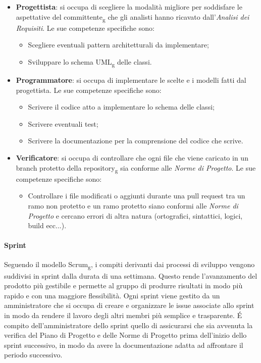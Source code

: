 \begin{itemize}
\item \textbf{Progettista}: si occupa di scegliere la modalità migliore per soddisfare le aspettative del committente\textsubscript{g} che gli analisti hanno ricavato dall'\textit{Analisi dei Requisiti}. Le sue competenze specifiche sono:
\begin{itemize}
	\item Scegliere eventuali pattern architetturali da implementare;
	\item Sviluppare lo schema UML\textsubscript{g} delle classi.
\end{itemize}

\item \textbf{Programmatore}: si occupa di implementare le scelte e i modelli fatti dal progettista. Le sue competenze specifiche sono:
\begin{itemize}
	\item Scrivere il codice atto a implementare lo schema delle classi;
	\item Scrivere eventuali test;
	\item Scrivere la documentazione per la comprensione del codice che scrive.
\end{itemize}

\item \textbf{Verificatore}: si occupa di controllare che ogni file che viene caricato in un branch protetto della repository\textsubscript{g} sia conforme alle \textit{Norme di Progetto}. Le sue competenze specifiche sono:
\begin{itemize}
	\item Controllare i file modificati o aggiunti durante una pull request tra un ramo non protetto e un ramo protetto siano conformi alle \textit{Norme di Progetto} e cercano errori di altra natura (ortografici, sintattici, logici, build ecc...).
\end{itemize}

\end{itemize}

\paragraph{Sprint}
Seguendo il modello Scrum\textsubscript{g}, i compiti derivanti dai processi di sviluppo vengono suddivisi in sprint dalla durata di una settimana. \newline
Questo rende l'avanzamento del prodotto più gestibile e permette al gruppo di produrre risultati in modo più rapido e con una maggiore flessibilità. \newline
Ogni sprint viene gestito da un amministratore che si occupa di creare e organizzare le issue associate allo sprint in modo da rendere il lavoro degli altri membri più semplice e trasparente. \newline
É compito dell'amministratore dello sprint quello di assicurarsi che sia avvenuta la verifica del Piano di Progetto e delle Norme di Progetto prima dell'inizio dello sprint successivo, in modo da avere la documentazione adatta ad affrontare il periodo successivo. 
